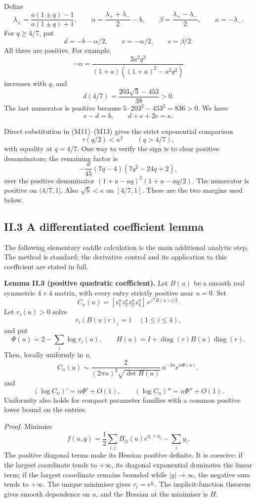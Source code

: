 \documentclass[
  british,
  10pt,
]{article}
\begin{document}
Define \[
\lambda_\pm=\frac{a(1\pm q)-1}{a(1\pm q)+1},\qquad
\alpha=\frac{\lambda_++\lambda_-}{2}-b,\qquad
\beta=\frac{\lambda_+-\lambda_-}{2},\qquad
\kappa=-\lambda_-.
\tag{M13}
\] For \(q\ge4/7\), put \[
d=-b-\alpha/2,\qquad e=-\alpha/2,\qquad c=\beta/2.
\tag{M14}
\] All three are positive. For example, \[
-\alpha=\frac{2a^2q^2}
 {(1+a)((1+a)^2-a^2q^2)}
\] increases with \(q\), and \[
d(4/7)=\frac{203\sqrt5-453}{38}>0.
\] The last numerator is positive because \(5\cdot203^2-453^2=836>0\).
We have \[
e-d=b,\qquad d+e+2c=\kappa.
\tag{M15}
\]

Direct substitution in (M11)--(M13) gives the strict exponential
comparison \[
\tau(q/2)<\kappa^2\qquad(q>4/7),
\tag{M16}
\] with equality at \(q=4/7\). One way to verify the sign is to clear
positive denominators; the remaining factor is \[
-\frac{a}{45}(7q-4)(7q^2-24q+2),
\] over the positive denominator \((1+a-aq)^2(1+a-aq/2)\). The numerator
is positive on \((4/7,1]\). Also \(\sqrt b<\kappa\) on \([4/7,1]\).
These are the two margins used below.

\subsection{II.3 A differentiated coefficient
lemma}\label{ii.3-a-differentiated-coefficient-lemma}

The following elementary saddle calculation is the main additional
analytic step. The method is standard; the derivative control and its
application to this coefficient are stated in full.

\textbf{Lemma II.3 (positive quadratic coefficient).} Let \(B(u)\) be a
smooth real symmetric \(4\times4\) matrix, with every entry strictly
positive near \(u=0\). Set \[
C_n(u)=[z_1^nz_2^nz_3^nz_4^n]\,
          e^{z^{\mathsf T}B(u)z/2}.
\] Let \(r_i(u)>0\) solve \[
r_i(B(u)r)_i=1\quad(1\le i\le4),
\] and put \[
\Phi(u)=2-\sum_i\log r_i(u),\qquad
H(u)=I+\operatorname{diag}(r)B(u)\operatorname{diag}(r).
\] Then, locally uniformly in \(u\), \[
C_n(u)\sim
\frac{2}{(2\pi n)^2\sqrt{\det H(u)}}\,
n^{-2n}e^{n\Phi(u)},
\tag{M17}
\] and \[
(\log C_n)'=n\Phi'+O(1),\qquad
(\log C_n)''=n\Phi''+O(1).
\tag{M18}
\] Uniformity also holds for compact parameter families with a common
positive lower bound on the entries.

\emph{Proof.} Minimise \[
f(u,y)=\frac12\sum_{i,j}B_{ij}(u)e^{y_i+y_j}-\sum_i y_i.
\] The positive diagonal terms make its Hessian positive definite. It is
coercive: if the largest coordinate tends to \(+\infty\), its diagonal
exponential dominates the linear term; if the largest coordinate remains
bounded while \(|y|\to\infty\), the negative sum tends to \(+\infty\).
The unique minimiser gives \(r_i=e^{y_i}\). The implicit-function
theorem gives smooth dependence on \(u\), and the Hessian at the
minimiser is \(H\).
\end{document}
